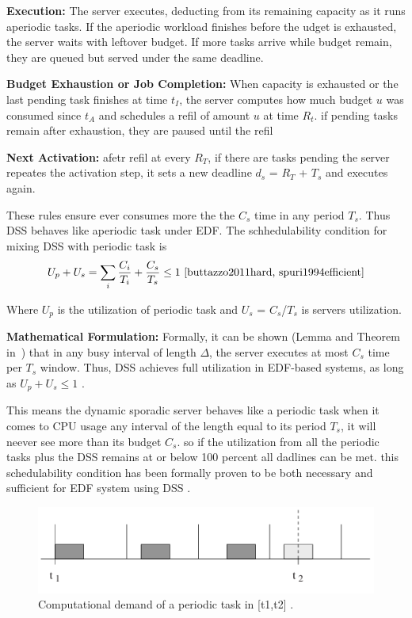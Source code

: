 \documentclass[conference]{IEEEtran}
\begin{document}
\textbf{Execution:} The server executes, deducting from its remaining capacity as it runs aperiodic tasks. If the aperiodic workload finishes before the udget is exhausted, the server waits with leftover budget. If more tasks arrive while budget remain, they are queued but served under the same deadline\cite{spuri1994efficient}. 

\textbf{Budget Exhaustion or Job Completion:} When capacity is exhausted or the last pending task finishes at time $t_I$, the server computes how much budget $u$ was consumed since $t_A$ and schedules a refil of amount $u$ at time $R_t$. if pending tasks remain after exhaustion, they are paused until the refil\cite{sprunt1989aperiodic, spuri1994efficient} 

\textbf{Next Activation:} afetr refil at every $R_T$, if there are tasks pending the server repeates the activation step, it sets a new deadline $d_s$ = $R_T$ + $T_s$ and executes again. 

These rules ensure ever consumes more the the $C_s$ time in any period $T_s$\cite{spuri1994efficient,buttazzo2011hard}. Thus DSS behaves like aperiodic task under EDF. The schhedulability condition for mixing DSS with periodic task is\cite{buttazzo2011hard}
\[
U_p + U_s = \sum_i \frac{C_i}{T_i} + \frac{C_s}{T_s} \leq 1
\ \cite{buttazzo2011hard, spuri1994efficient} \]

Where $U_p$ is the utilization of periodic task and $U_s$ = $C_s$/$T_s$ is servers utilization\cite{buttazzo2011hard}.

\textbf{Mathematical Formulation:} Formally, it can be shown (Lemma and Theorem in~\cite{spuri1994efficient}) that in any busy interval of length $\Delta$, the server executes at most $C_s$ time per $T_s$ window. 
Thus, DSS achieves full utilization in EDF-based systems, as long as $U_p + U_s \leq 1$  \cite{buttazzo2011hard}.

This means the dynamic sporadic server behaves like a periodic task when it comes to CPU usage any interval of the length equal to its period $T_s$, it will neever see more than its budget $C_s$. so if the utilization from all the periodic tasks plus the DSS remains at or below 100 percent all dadlines can be met. this schedulability condition has been formally proven to be both necessary and sufficient for EDF system using DSS \cite{buttazzo2011hard, spuri1994efficient}.

\begin{figure}
    \centering
    \includegraphics[width=1\linewidth]{image.png}
    \caption{Computational demand of a periodic task in [t1,t2] \cite{buttazzo2011hard}.}
    \label{fig:enter-label}
\end{figure}
\end{document}
